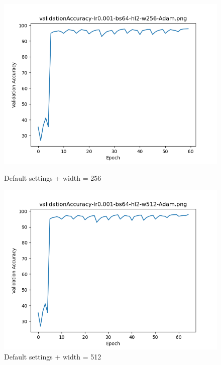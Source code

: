 \documentclass{article}[12pt]
\begin{document}
        \begin{figure}[H]
        \includegraphics[width=\linewidth]{testsResults/validationAccuracy/validationAccuracy-lr0.001-bs64-hl2-w256-Adam.png}
        \caption{Default settings + width = 256}
        \endminipage
        \includegraphics[width=\linewidth]{testsResults/validationAccuracy/validationAccuracy-lr0.001-bs64-hl2-w512-Adam.png}
        \caption{Default settings + width = 512}
        \endminipage
    \end{figure}
\end{document}
